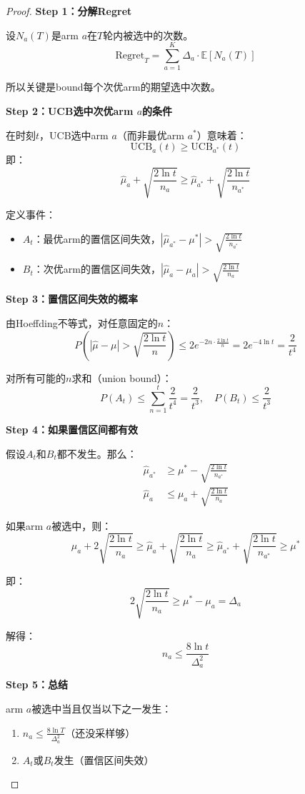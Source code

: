 \documentclass[11pt,a4paper]{article}
\theoremstyle{definition}
\begin{document}
\begin{proof}
\textbf{Step 1：分解Regret}

设$N_a(T)$是arm $a$在$T$轮内被选中的次数。
\[
\text{Regret}_T = \sum_{a=1}^K \Delta_a \cdot \mathbb{E}[N_a(T)]
\]

所以关键是bound每个次优arm的期望选中次数。

\textbf{Step 2：UCB选中次优arm $a$的条件}

在时刻$t$，UCB选中arm $a$（而非最优arm $a^*$）意味着：
\[
\text{UCB}_a(t) \geq \text{UCB}_{a^*}(t)
\]
即：
\[
\hat{\mu}_a + \sqrt{\frac{2\ln t}{n_a}} \geq \hat{\mu}_{a^*} + \sqrt{\frac{2\ln t}{n_{a^*}}}
\]

定义事件：
\begin{itemize}
    \item $A_t$：最优arm的置信区间失效，$|\hat{\mu}_{a^*} - \mu^*| > \sqrt{\frac{2\ln t}{n_{a^*}}}$
    \item $B_t$：次优arm的置信区间失效，$|\hat{\mu}_a - \mu_a| > \sqrt{\frac{2\ln t}{n_a}}$
\end{itemize}

\textbf{Step 3：置信区间失效的概率}

由Hoeffding不等式，对任意固定的$n$：
\[
P\left(|\hat{\mu} - \mu| > \sqrt{\frac{2\ln t}{n}}\right) \leq 2e^{-2n \cdot \frac{2\ln t}{n}} = 2e^{-4\ln t} = \frac{2}{t^4}
\]

对所有可能的$n$求和（union bound）：
\[
P(A_t) \leq \sum_{n=1}^t \frac{2}{t^4} = \frac{2}{t^3}, \quad P(B_t) \leq \frac{2}{t^3}
\]

\textbf{Step 4：如果置信区间都有效}

假设$A_t$和$B_t$都不发生。那么：
\begin{align*}
\hat{\mu}_{a^*} &\geq \mu^* - \sqrt{\frac{2\ln t}{n_{a^*}}} \\
\hat{\mu}_a &\leq \mu_a + \sqrt{\frac{2\ln t}{n_a}}
\end{align*}

如果arm $a$被选中，则：
\[
\mu_a + 2\sqrt{\frac{2\ln t}{n_a}} \geq \hat{\mu}_a + \sqrt{\frac{2\ln t}{n_a}} \geq \hat{\mu}_{a^*} + \sqrt{\frac{2\ln t}{n_{a^*}}} \geq \mu^*
\]

即：
\[
2\sqrt{\frac{2\ln t}{n_a}} \geq \mu^* - \mu_a = \Delta_a
\]

解得：
\[
n_a \leq \frac{8\ln t}{\Delta_a^2}
\]

\textbf{Step 5：总结}

arm $a$被选中当且仅当以下之一发生：
\begin{enumerate}
    \item $n_a \leq \frac{8\ln T}{\Delta_a^2}$（还没采样够）
    \item $A_t$或$B_t$发生（置信区间失效）
\end{enumerate}


\end{proof}
\end{document}
